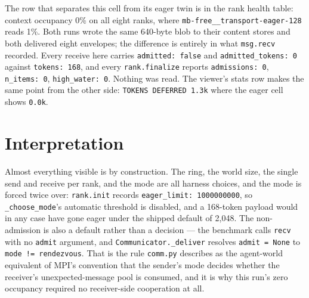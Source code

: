 \documentclass[11pt]{article}
\begin{document}
The row that separates this cell from its eager twin is in the rank health table:
context occupancy 0\% on all eight ranks, where
\texttt{mb-free\_\_transport-eager-128} reads 1\%. Both runs wrote the same 640-byte
blob to their content stores and both delivered eight envelopes; the difference is
entirely in what \texttt{msg.recv} recorded. Every receive here carries
\texttt{admitted: false} and \texttt{admitted\_tokens: 0} against
\texttt{tokens: 168}, and every \texttt{rank.finalize} reports \texttt{admissions: 0},
\texttt{n\_items: 0}, \texttt{high\_water: 0}. Nothing was read. The viewer's stats
row makes the same point from the other side: \texttt{TOKENS DEFERRED 1.3k} where the
eager cell shows \texttt{0.0k}.

\section{Interpretation}

Almost everything visible is by construction. The ring, the world size, the single
send and receive per rank, and the mode are all harness choices, and the mode is
forced twice over: \texttt{rank.init} records \texttt{eager\_limit: 1000000000}, so
\texttt{\_choose\_mode}'s automatic threshold is disabled, and a 168-token payload
would in any case have gone eager under the shipped default of 2{,}048. The
non-admission is also a default rather than a decision --- the benchmark calls
\texttt{recv} with no \texttt{admit} argument, and \texttt{Communicator.\_deliver}
resolves \texttt{admit = None} to \texttt{mode != rendezvous}. That is the rule
\texttt{comm.py} describes as the agent-world equivalent of MPI's convention that the
sender's mode decides whether the receiver's unexpected-message pool is consumed, and
it is why this run's zero occupancy required no receiver-side cooperation at all.
\end{document}
